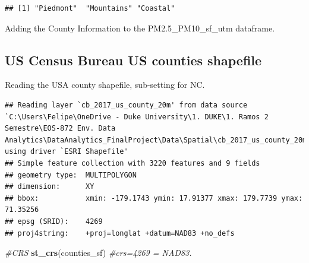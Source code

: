 \documentclass[12pt,]{article}
\newenvironment{Shaded}{\begin{snugshade}}{\end{snugshade}}
\newcommand{\KeywordTok}[1]{\textcolor[rgb]{0.13,0.29,0.53}{\textbf{#1}}}
\newcommand{\DataTypeTok}[1]{\textcolor[rgb]{0.13,0.29,0.53}{#1}}
\newcommand{\DecValTok}[1]{\textcolor[rgb]{0.00,0.00,0.81}{#1}}
\newcommand{\StringTok}[1]{\textcolor[rgb]{0.31,0.60,0.02}{#1}}
\newcommand{\CommentTok}[1]{\textcolor[rgb]{0.56,0.35,0.01}{\textit{#1}}}
\newcommand{\OperatorTok}[1]{\textcolor[rgb]{0.81,0.36,0.00}{\textbf{#1}}}
\newcommand{\NormalTok}[1]{#1}
\begin{document}
\begin{verbatim}
## [1] "Piedmont"  "Mountains" "Coastal"
\end{verbatim}

Adding the County Information to the PM2.5\_PM10\_sf\_utm dataframe.

\begin{Shaded}
\end{Shaded}

\subsection{US Census Bureau US counties
shapefile}\label{us-census-bureau-us-counties-shapefile-1}

Reading the USA county shapefile, sub-setting for NC.

\begin{Shaded}
\end{Shaded}

\begin{verbatim}
## Reading layer `cb_2017_us_county_20m' from data source `C:\Users\Felipe\OneDrive - Duke University\1. DUKE\1. Ramos 2 Semestre\EOS-872 Env. Data Analytics\DataAnalytics_FinalProject\Data\Spatial\cb_2017_us_county_20m.shp' using driver `ESRI Shapefile'
## Simple feature collection with 3220 features and 9 fields
## geometry type:  MULTIPOLYGON
## dimension:      XY
## bbox:           xmin: -179.1743 ymin: 17.91377 xmax: 179.7739 ymax: 71.35256
## epsg (SRID):    4269
## proj4string:    +proj=longlat +datum=NAD83 +no_defs
\end{verbatim}

\begin{Shaded}
\begin{Highlighting}[]
\CommentTok{#CRS}
\KeywordTok{st_crs}\NormalTok{(counties_sf) }\CommentTok{#crs=4269 = NAD83.}
\end{Highlighting}
\end{Shaded}
\end{document}
